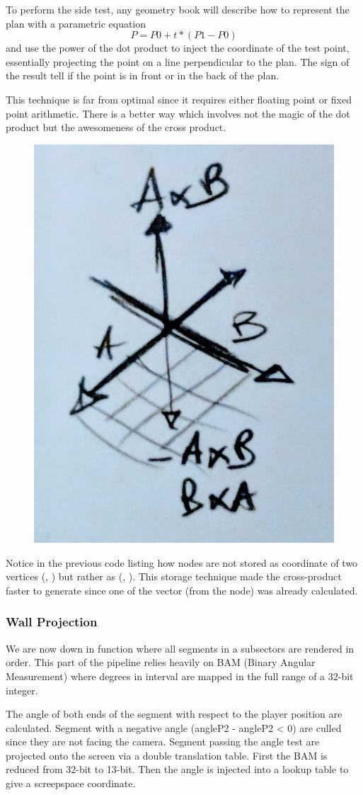To perform the side test, any geometry book will describe how to represent the plan with a parametric equation $$ P = P0 + t * (P1 - P0) $$
and use the power of the dot product to inject the coordinate of the test point, essentially projecting the point on a line perpendicular to the plan. The sign of the result tell if the point is in front or in the back of the plan.\\
\par
This technique is far from optimal since it requires either floating point or fixed point arithmetic. There is a better way which involves not the magic of the dot product but the awesomeness of the cross product.\\
\par
{}
\pagebreak


\begin{figure}
\centering
\includegraphics[width=.25\textwidth]{drawings/line_cross_product.png}
\end{figure}
Notice in the previous code listing how nodes are not stored as coordinate of two vertices (, ) but rather as (, ). This storage technique made the cross-product faster to generate since one of the vector (from the node) was already calculated.\\
\par


\subsubsection{Wall Projection}
We are now down in  function where all segments in a subsectors are rendered in order. This part of the pipeline relies heavily on BAM (Binary Angular Measurement) where degrees in interval \cw{[0, 360]} are mapped in the full range of a 32-bit integer.\\
\par
{}
\par
The angle of both ends of the segment with respect to the player position are calculated. Segment with a negative angle (angleP2 - angleP2 < 0) are culled since they are not facing the camera. Segment passing the angle test are projected onto the screen via a double translation table. First the BAM is reduced from 32-bit to 13-bit. Then the angle is injected into a lookup table  to give a screepspace  coordinate.\\
 \par

